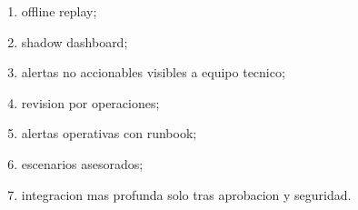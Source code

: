 \documentclass[
  spanish,
  10pt,
  a4paper,
]{article}
\providecommand{\tightlist}{%
  \setlength{\itemsep}{0pt}\setlength{\parskip}{0pt}}
\begin{document}
\begin{enumerate}
\def\labelenumi{\arabic{enumi}.}
\tightlist
\item
  offline replay;
\item
  shadow dashboard;
\item
  alertas no accionables visibles a equipo tecnico;
\item
  revision por operaciones;
\item
  alertas operativas con runbook;
\item
  escenarios asesorados;
\item
  integracion mas profunda solo tras aprobacion y seguridad.
\end{enumerate}
\end{document}
